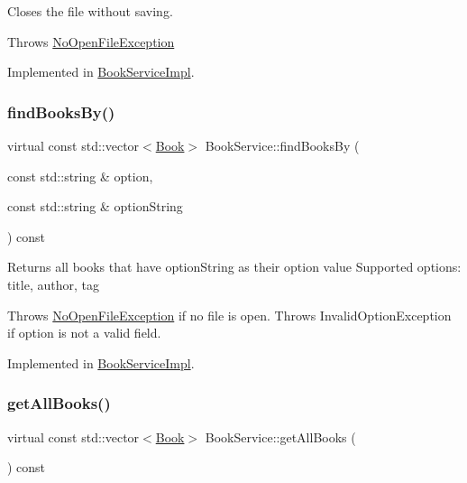 Closes the file without saving.

Throws \hyperlink{structNoOpenFileException}{No\+Open\+File\+Exception} 

Implemented in \hyperlink{classBookServiceImpl_abf8207579fffae1a2bd1003b8684d994}{Book\+Service\+Impl}.

\mbox{\label{classBookService_a07bfc2c15f92d0b7dafba7464eff48e1}} 
\subsubsection{\texorpdfstring{find\+Books\+By()}{findBooksBy()}}
{\footnotesize\ttfamily virtual const std\+::vector$<$\hyperlink{classBook}{Book}$>$ Book\+Service\+::find\+Books\+By (\begin{DoxyParamCaption}\item[{const std\+::string \&}]{option,  }\item[{const std\+::string \&}]{option\+String }\end{DoxyParamCaption}) const\hspace{0.3cm}{\ttfamily [pure virtual]}}

Returns all books that have option\+String as their option value Supported options\+: title, author, tag

Throws \hyperlink{structNoOpenFileException}{No\+Open\+File\+Exception} if no file is open. Throws Invalid\+Option\+Exception if option is not a valid field. 

Implemented in \hyperlink{classBookServiceImpl_a650bd2918bbacfd628e1d399a1c82b48}{Book\+Service\+Impl}.

\mbox{\label{classBookService_a032755934b16f7c93078b54aaf2f6128}} 
\subsubsection{\texorpdfstring{get\+All\+Books()}{getAllBooks()}}
{\footnotesize\ttfamily virtual const std\+::vector$<$\hyperlink{classBook}{Book}$>$ Book\+Service\+::get\+All\+Books (\begin{DoxyParamCaption}{ }\end{DoxyParamCaption}) const\hspace{0.3cm}{\ttfamily [pure virtual]}}

